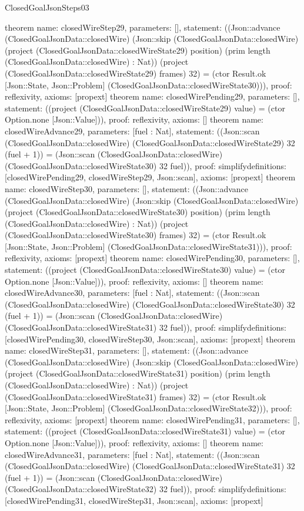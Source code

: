 \begin{lexlean}{ClosedGoalJsonSteps03}
\begin{semanticmodule}
{}
theorem{
 name: closedWireStep29, parameters: [],
 statement: ((Json::advance (ClosedGoalJsonData::closedWire) (Json::skip (ClosedGoalJsonData::closedWire) (project (ClosedGoalJsonData::closedWireState29) position) (prim length (ClosedGoalJsonData::closedWire) : Nat)) (project (ClosedGoalJsonData::closedWireState29) frames) 32) = (ctor Result.ok [Json::State, Json::Problem] (ClosedGoalJsonData::closedWireState30))), proof: reflexivity{}, axioms: [propext]
}
theorem{
 name: closedWirePending29, parameters: [],
 statement: ((project (ClosedGoalJsonData::closedWireState29) value) = (ctor Option.none [Json::Value])), proof: reflexivity{}, axioms: []
}
theorem{
 name: closedWireAdvance29, parameters: [fuel : Nat],
 statement: ((Json::scan (ClosedGoalJsonData::closedWire) (ClosedGoalJsonData::closedWireState29) 32 (fuel + 1)) = (Json::scan (ClosedGoalJsonData::closedWire) (ClosedGoalJsonData::closedWireState30) 32 fuel)), proof: simplify{definitions: [closedWirePending29, closedWireStep29, Json::scan]}, axioms: [propext]
}
theorem{
 name: closedWireStep30, parameters: [],
 statement: ((Json::advance (ClosedGoalJsonData::closedWire) (Json::skip (ClosedGoalJsonData::closedWire) (project (ClosedGoalJsonData::closedWireState30) position) (prim length (ClosedGoalJsonData::closedWire) : Nat)) (project (ClosedGoalJsonData::closedWireState30) frames) 32) = (ctor Result.ok [Json::State, Json::Problem] (ClosedGoalJsonData::closedWireState31))), proof: reflexivity{}, axioms: [propext]
}
theorem{
 name: closedWirePending30, parameters: [],
 statement: ((project (ClosedGoalJsonData::closedWireState30) value) = (ctor Option.none [Json::Value])), proof: reflexivity{}, axioms: []
}
theorem{
 name: closedWireAdvance30, parameters: [fuel : Nat],
 statement: ((Json::scan (ClosedGoalJsonData::closedWire) (ClosedGoalJsonData::closedWireState30) 32 (fuel + 1)) = (Json::scan (ClosedGoalJsonData::closedWire) (ClosedGoalJsonData::closedWireState31) 32 fuel)), proof: simplify{definitions: [closedWirePending30, closedWireStep30, Json::scan]}, axioms: [propext]
}
theorem{
 name: closedWireStep31, parameters: [],
 statement: ((Json::advance (ClosedGoalJsonData::closedWire) (Json::skip (ClosedGoalJsonData::closedWire) (project (ClosedGoalJsonData::closedWireState31) position) (prim length (ClosedGoalJsonData::closedWire) : Nat)) (project (ClosedGoalJsonData::closedWireState31) frames) 32) = (ctor Result.ok [Json::State, Json::Problem] (ClosedGoalJsonData::closedWireState32))), proof: reflexivity{}, axioms: [propext]
}
theorem{
 name: closedWirePending31, parameters: [],
 statement: ((project (ClosedGoalJsonData::closedWireState31) value) = (ctor Option.none [Json::Value])), proof: reflexivity{}, axioms: []
}
theorem{
 name: closedWireAdvance31, parameters: [fuel : Nat],
 statement: ((Json::scan (ClosedGoalJsonData::closedWire) (ClosedGoalJsonData::closedWireState31) 32 (fuel + 1)) = (Json::scan (ClosedGoalJsonData::closedWire) (ClosedGoalJsonData::closedWireState32) 32 fuel)), proof: simplify{definitions: [closedWirePending31, closedWireStep31, Json::scan]}, axioms: [propext]
}
\end{semanticmodule}
\end{lexlean}
